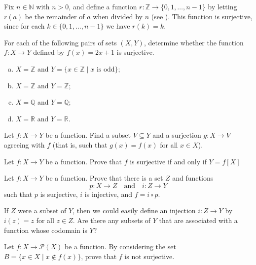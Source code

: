 \begin{example}
Fix $n \in \mathbb{N}$ with $n > 0$, and define a function $r : \mathbb{Z} \to \{ 0, 1, \dots, n-1 \}$ by letting $r(a)$ be the remainder of $a$ when divided by $n$ (see ). This function is surjective, since for each $k \in \{ 0, 1, \dots, n-1 \}$ we have $r(k)=k$.
\end{example}

\begin{exercise}
For each of the following pairs of sets $(X,Y)$, determine whether the function $f : X \to Y$ defined by $f(x)=2x+1$ is surjective.
\begin{enumerate}[(a)]
\item $X = \mathbb{Z}$ and $Y = \{ x \in \mathbb{Z} \mid x \text{ is odd} \}$;
\item $X = \mathbb{Z}$ and $Y = \mathbb{Z}$;
\item $X = \mathbb{Q}$ and $Y = \mathbb{Q}$;
\item $X = \mathbb{R}$ and $Y = \mathbb{R}$.
\end{enumerate}
\end{exercise}

\begin{exercise}
Let $f : X \to Y$ be a function. Find a subset $V \subseteq Y$ and a surjection $g : X \to V$ agreeing with $f$ (that is, such that $g(x)=f(x)$ for all $x \in X$).
\end{exercise}

\begin{exercise}
Let $f : X \to Y$ be a function. Prove that $f$ is surjective if and only if $Y=f[X]$
\end{exercise}

\begin{exercise}
\label{exEpiMonoFactorisation}
Let $f : X \to Y$ be a function. Prove that there is a set $Z$ and functions
\[ p : X \to Z \quad \text{and} \quad i : Z \to Y \]
such that $p$ is surjective, $i$ is injective, and $f = i \circ p$.
\begin{backhint}
If $Z$ were a subset of $Y$, then we could easily define an injection $i : Z \to Y$ by $i(z)=z$ for all $z \in Z$. Are there any subsets of $Y$ that are associated with a function whose codomain is $Y$?
\end{backhint}
\end{exercise}

\begin{exercise}
Let $f : X \to \mathcal{P}(X)$ be a function. By considering the set $B = \{ x \in X \mid x \not\in f(x) \}$, prove that $f$ is not surjective.
\end{exercise}

